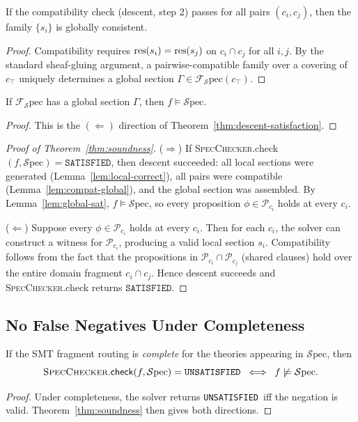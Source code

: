\documentclass[11pt]{article}
\newcommand{\Spec}{\mathcal{S}\mathrm{pec}}        %
\newcommand{\SpecCh}{\textsc{SpecChecker}}          %
\newcommand{\Props}{\mathcal{P}}                    %
\newcommand{\CoordProps}[1]{\Props_{#1}}            %
\newcommand{\GlobalSec}{\Gamma}                     %
\newcommand{\LocalSec}[1]{s_{#1}}                  %
\newcommand{\SAT}{\texttt{SATISFIED}}               %
\newcommand{\UNSAT}{\texttt{UNSATISFIED}}           %
\begin{document}
\begin{lemma}\label{lem:compat-global}
If the compatibility check (descent, step 2) passes for all pairs
$(c_i, c_j)$, then the family $\{\LocalSec{i}\}$ is globally
consistent.
\end{lemma}
\begin{proof}
Compatibility requires $\res(\LocalSec{i}) = \res(\LocalSec{j})$ on
$c_i \cap c_j$ for all $i, j$.  By the standard sheaf-gluing argument,
a pairwise-compatible family over a covering of $c_\top$ uniquely
determines a global section $\GlobalSec \in \mathcal{F}_\Spec(c_\top)$.
\end{proof}

\begin{lemma}\label{lem:global-sat}
If $\mathcal{F}_\Spec$ has a global section $\GlobalSec$, then
$f \models \Spec$.
\end{lemma}
\begin{proof}
This is the $(\Leftarrow)$ direction of Theorem~\ref{thm:descent-satisfaction}.
\end{proof}

\begin{proof}[Proof of Theorem~\ref{thm:soundness}]
($\Rightarrow$)
If \SpecCh.check$(f, \Spec) = \SAT$, then descent succeeded:
all local sections were generated (Lemma~\ref{lem:local-correct}),
all pairs were compatible (Lemma~\ref{lem:compat-global}), and the
global section was assembled.  By Lemma~\ref{lem:global-sat},
$f \models \Spec$, so every proposition $\phi \in \CoordProps{c_i}$
holds at every $c_i$.

($\Leftarrow$)
Suppose every $\phi \in \CoordProps{c_i}$ holds at every $c_i$.
Then for each $c_i$, the solver can construct a witness for
$\CoordProps{c_i}$, producing a valid local section $\LocalSec{i}$.
Compatibility follows from the fact that the propositions in
$\CoordProps{c_i} \cap \CoordProps{c_j}$ (shared clauses) hold
over the entire domain fragment $c_i \cap c_j$.
Hence descent succeeds and \SpecCh.check returns $\SAT$.
\end{proof}

\subsection{No False Negatives Under Completeness}\label{sec:completeness}

\begin{corollary}\label{cor:complete}
If the SMT fragment routing is \emph{complete} for the theories
appearing in $\Spec$, then
\[
  \SpecCh.\mathsf{check}(f, \Spec) = \UNSAT
  \;\iff\;
  f \not\models \Spec.
\]
\end{corollary}
\begin{proof}
Under completeness, the solver returns \UNSAT\ iff the negation is
valid.  Theorem~\ref{thm:soundness} then gives both directions.
\end{proof}
\end{document}
